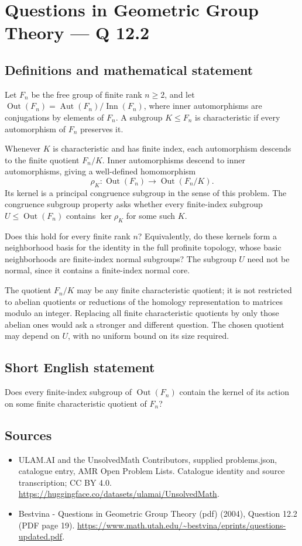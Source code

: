 \documentclass[11pt,a4paper]{article}
\begin{document}
\section*{Questions in Geometric Group Theory — Q 12.2}\label{statement}

\subsection{Definitions and mathematical statement}
Let $F_n$ be the free group of finite rank $n\geq2$, and let
$\operatorname{Out}(F_n)=\operatorname{Aut}(F_n)/\operatorname{Inn}(F_n)$, where inner automorphisms are conjugations by elements of $F_n$. A subgroup $K\leq F_n$ is characteristic if every automorphism of $F_n$ preserves it.

Whenever $K$ is characteristic and has finite index, each automorphism descends to the finite quotient $F_n/K$. Inner automorphisms descend to inner automorphisms, giving a well-defined homomorphism
\[
 \rho_K:\operatorname{Out}(F_n)\longrightarrow
                     \operatorname{Out}(F_n/K).
\]
Its kernel is a principal congruence subgroup in the sense of this problem. The congruence subgroup property asks whether every finite-index subgroup $U\leq\operatorname{Out}(F_n)$ contains $\ker\rho_K$ for some such $K$.

Does this hold for every finite rank $n$? Equivalently, do these kernels form a neighborhood basis for the identity in the full profinite topology, whose basic neighborhoods are finite-index normal subgroups? The subgroup $U$ need not be normal, since it contains a finite-index normal core.

The quotient $F_n/K$ may be any finite characteristic quotient; it is not restricted to abelian quotients or reductions of the homology representation to matrices modulo an integer. Replacing all finite characteristic quotients by only those abelian ones would ask a stronger and different question. The chosen quotient may depend on $U$, with no uniform bound on its size required.
\subsection{Short English statement}
Does every finite-index subgroup of $\operatorname{Out}(F_n)$ contain the kernel of its action on some finite characteristic quotient of $F_n$?
\subsection{Sources}
\begin{itemize}
\item[S1] ULAM.AI and the UnsolvedMath Contributors, supplied problems.json, catalogue entry, AMR Open Problem Lists. Catalogue identity and source transcription; CC BY 4.0.
\url{https://huggingface.co/datasets/ulamai/UnsolvedMath}.
\item[S2] Bestvina - Questions in Geometric Group Theory (pdf) (2004), Question 12.2 (PDF page 19). 
\url{https://www.math.utah.edu/~bestvina/eprints/questions-updated.pdf}.
\end{itemize}
\end{document}
